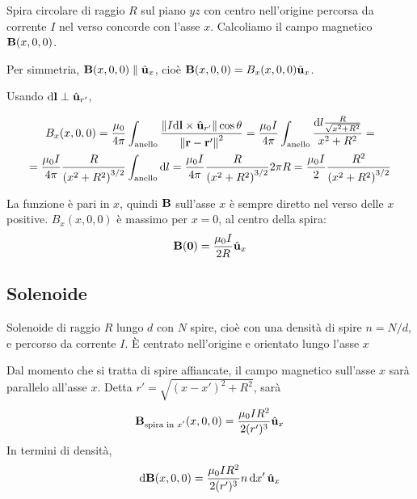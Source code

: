 Spira circolare di raggio $R$ sul piano $yz$ con centro nell'origine percorsa da corrente $I$ nel verso concorde con l'asse $x$.
Calcoliamo il campo magnetico $\mathbf{B}(x, 0, 0)$.

Per simmetria, $\mathbf{B}(x, 0, 0) \parallel \hat{\mathbf{u}}_{x}$, cioè $\mathbf{B}(x, 0, 0) = B_x(x, 0, 0)\hat{\mathbf{u}}_{x}$.

Usando $\mathrm{d} \mathbf{l} \perp \hat{\mathbf{u}}_{r'}$,

\begin{equation}
\begin{gathered}
\label{eq:campo_spira}
    B_x(x, 0, 0) = \frac{\mu_0}{4\pi} \int_\mathrm{anello} \frac{\left\lVert I \mathrm{d} \mathbf{l} \times \hat{\mathbf{u}}_{r'} \right\rVert \cos \theta}{\left\lVert \mathbf{r} - \mathbf{r}' \right\rVert^2}
    = \frac{\mu_0 I}{4\pi} \int_\mathrm{anello} \frac{\mathrm{d} l \frac{R}{\sqrt{x^2 + R^2}}}{x^2 + R^2} = \\
    = \frac{\mu_0 I}{4\pi} \frac{R}{\left( x^2 + R^2 \right)^{3/2}} \int_\mathrm{anello} \mathrm{d} l
    = \frac{\mu_0 I}{4\pi} \frac{R}{\left( x^2 + R^2 \right)^{3/2}} 2 \pi R
    = \frac{\mu_0 I}{2} \frac{R^2}{\left( x^2 + R^2 \right)^{3/2}}
\end{gathered}
\end{equation}

La funzione è pari in $x$, quindi $\mathbf{B}$ sull'asse $x$ è sempre diretto nel verso delle $x$ positive.
$B_x(x, 0, 0)$ è massimo per $x = 0$, al centro della spira:
\begin{equation}
    \mathbf{B}(\mathbf{0}) = \frac{\mu_0 I}{2 R} \hat{\mathbf{u}}_{x}
\end{equation}



\subsection{Solenoide}

Solenoide di raggio $R$ lungo $d$ con $N$ spire, cioè con una densità di spire $n = N/d$, e percorso da corrente $I$.
È centrato nell'origine e orientato lungo l'asse $x$

Dal momento che si tratta di spire affiancate, il campo magnetico sull'asse $x$ sarà parallelo all'asse $x$. Detta $r' = \sqrt{(x - x')^2 + R^2}$, sarà
\begin{equation}
    \mathbf{B}_\text{spira in $x'$}(x, 0, 0) = \frac{\mu_0 I R^2}{2 (r')^3} \hat{\mathbf{u}}_{x}
\end{equation}
In termini di densità,
\begin{equation}
    \mathrm{d}\mathbf{B}(x, 0, 0) = \frac{\mu_0 I R^2}{2 (r')^3} n \, \mathrm{d} x' \, \hat{\mathbf{u}}_{x}
\end{equation}

